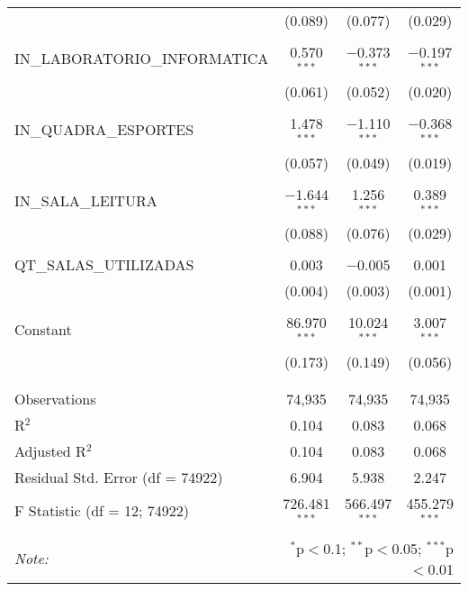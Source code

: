 \begin{table}[!htbp]
\begin{tabular}{@{\extracolsep{5pt}}lccc}
  & (0.089) & (0.077) & (0.029) \\ 
  & & & \\ 
 IN\_LABORATORIO\_INFORMATICA & 0.570$^{***}$ & $-$0.373$^{***}$ & $-$0.197$^{***}$ \\ 
  & (0.061) & (0.052) & (0.020) \\ 
  & & & \\ 
 IN\_QUADRA\_ESPORTES & 1.478$^{***}$ & $-$1.110$^{***}$ & $-$0.368$^{***}$ \\ 
  & (0.057) & (0.049) & (0.019) \\ 
  & & & \\ 
 IN\_SALA\_LEITURA & $-$1.644$^{***}$ & 1.256$^{***}$ & 0.389$^{***}$ \\ 
  & (0.088) & (0.076) & (0.029) \\ 
  & & & \\ 
 QT\_SALAS\_UTILIZADAS & 0.003 & $-$0.005 & 0.001 \\ 
  & (0.004) & (0.003) & (0.001) \\ 
  & & & \\ 
 Constant & 86.970$^{***}$ & 10.024$^{***}$ & 3.007$^{***}$ \\ 
  & (0.173) & (0.149) & (0.056) \\ 
  & & & \\ 
\hline \\[-1.8ex] 
Observations & 74,935 & 74,935 & 74,935 \\ 
R$^{2}$ & 0.104 & 0.083 & 0.068 \\ 
Adjusted R$^{2}$ & 0.104 & 0.083 & 0.068 \\ 
Residual Std. Error (df = 74922) & 6.904 & 5.938 & 2.247 \\ 
F Statistic (df = 12; 74922) & 726.481$^{***}$ & 566.497$^{***}$ & 455.279$^{***}$ \\ 
\hline 
\hline \\[-1.8ex] 
\textit{Note:}  & \multicolumn{3}{r}{$^{*}$p$<$0.1; $^{**}$p$<$0.05; $^{***}$p$<$0.01} \\ 
\end{tabular} 
\end{table} 
